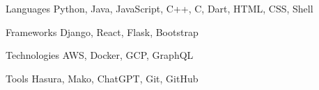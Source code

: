 
\begin{cvskills}
  \cvskill
    {Languages} %
    {Python, Java, JavaScript, C++, C, Dart, HTML, CSS, Shell} %

  \cvskill
    {Frameworks} %
    {Django, React, Flask, Bootstrap} %

  \cvskill
    {Technologies}
    {AWS, Docker, GCP, GraphQL}

  \cvskill
    {Tools}
    {Hasura, Mako, ChatGPT, Git, GitHub}
\end{cvskills}
